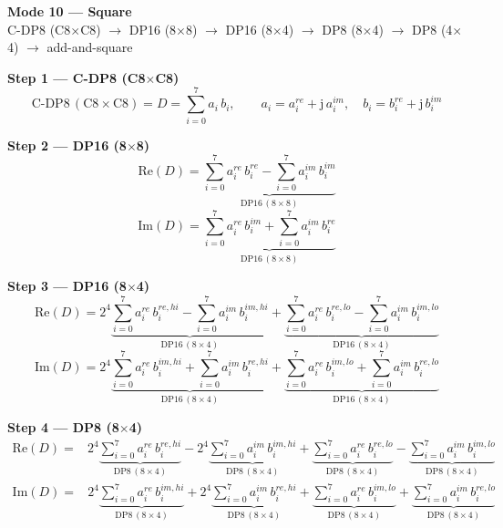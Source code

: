 \documentclass[fleqn]{article}
\newcommand{\DPop}[3]{\mathrm{DP#1}\,(#2\!\times\!#3)}
\begin{document}
\begin{center}
{\LARGE \textbf{Mode 10 --- Square}}\\[4pt]
{\large C-DP8 (C8$\times$C8) $\rightarrow$ DP16 (8$\times$8) $\rightarrow$ DP16 (8$\times$4) $\rightarrow$ DP8 (8$\times$4) $\rightarrow$ DP8 (4$\times$4) $\rightarrow$ add-and-square}
\end{center}

\vspace{0.1em}

\textbf{Step 1 --- C-DP8 (C8$\times$C8)}
\[
\text{C-DP8}\,(\mathrm{C8}\!\times\!\mathrm{C8}) = D = \sum_{i=0}^{7} a_i \, b_i, \qquad
a_i = a_i^{re} + \mathrm{j}\,a_i^{im}, \quad
b_i = b_i^{re} + \mathrm{j}\,b_i^{im}
\]

\textbf{Step 2 --- DP16 (8$\times$8)}
\[
\mathrm{Re}(D) = \underbrace{\sum_{i=0}^{7} a_i^{re}\, b_i^{re}
  - \sum_{i=0}^{7} a_i^{im}\, b_i^{im}}_{\DPop{16}{8}{8}}
\]
\[
\mathrm{Im}(D) = \underbrace{\sum_{i=0}^{7} a_i^{re}\, b_i^{im}
  + \sum_{i=0}^{7} a_i^{im}\, b_i^{re}}_{\DPop{16}{8}{8}}
\]

\textbf{Step 3 --- DP16 (8$\times$4)}
\[
\mathrm{Re}(D) = 2^{4}\underbrace{\sum_{i=0}^{7} a_i^{re}\, b_i^{re,hi}
  - \sum_{i=0}^{7} a_i^{im}\, b_i^{im,hi}}_{\DPop{16}{8}{4}}
  + \underbrace{\sum_{i=0}^{7} a_i^{re}\, b_i^{re,lo}
  - \sum_{i=0}^{7} a_i^{im}\, b_i^{im,lo}}_{\DPop{16}{8}{4}}
\]
\[
\mathrm{Im}(D) = 2^{4}\underbrace{\sum_{i=0}^{7} a_i^{re}\, b_i^{im,hi}
  + \sum_{i=0}^{7} a_i^{im}\, b_i^{re,hi}}_{\DPop{16}{8}{4}}
  + \underbrace{\sum_{i=0}^{7} a_i^{re}\, b_i^{im,lo}
  + \sum_{i=0}^{7} a_i^{im}\, b_i^{re,lo}}_{\DPop{16}{8}{4}}
\]

\textbf{Step 4 --- DP8 (8$\times$4)}
\begin{align*}
\mathrm{Re}(D) = {}
  & 2^{4}\underbrace{\sum_{i=0}^{7} a_i^{re}\, b_i^{re,hi}}_{\DPop{8}{8}{4}}
  - 2^{4}\underbrace{\sum_{i=0}^{7} a_i^{im}\, b_i^{im,hi}}_{\DPop{8}{8}{4}}
  + \underbrace{\sum_{i=0}^{7} a_i^{re}\, b_i^{re,lo}}_{\DPop{8}{8}{4}}
  - \underbrace{\sum_{i=0}^{7} a_i^{im}\, b_i^{im,lo}}_{\DPop{8}{8}{4}}
\end{align*}
\begin{align*}
\mathrm{Im}(D) = {}
  & 2^{4}\underbrace{\sum_{i=0}^{7} a_i^{re}\, b_i^{im,hi}}_{\DPop{8}{8}{4}}
  + 2^{4}\underbrace{\sum_{i=0}^{7} a_i^{im}\, b_i^{re,hi}}_{\DPop{8}{8}{4}}
  + \underbrace{\sum_{i=0}^{7} a_i^{re}\, b_i^{im,lo}}_{\DPop{8}{8}{4}}
  + \underbrace{\sum_{i=0}^{7} a_i^{im}\, b_i^{re,lo}}_{\DPop{8}{8}{4}}
\end{align*}
\end{document}
